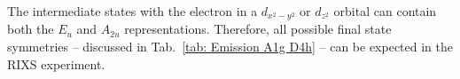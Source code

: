 \documentclass[twocolumn,prb,twocolumn,amsmath,superscriptaddress,nofootinbib,amssymb]{revtex4-1}
\begin{document}
\begin{widetext}
%

The intermediate states with the electron in a $d_{x^2-y^2}$ or $d_{z^2}$ orbital can contain both the $E_u$ and $A_{2u}$ representations. Therefore, all possible final state symmetries -- discussed in Tab.~\ref{tab: Emission A1g D4h} -- can be expected in the RIXS experiment.

%




\end{widetext}
\end{document}
